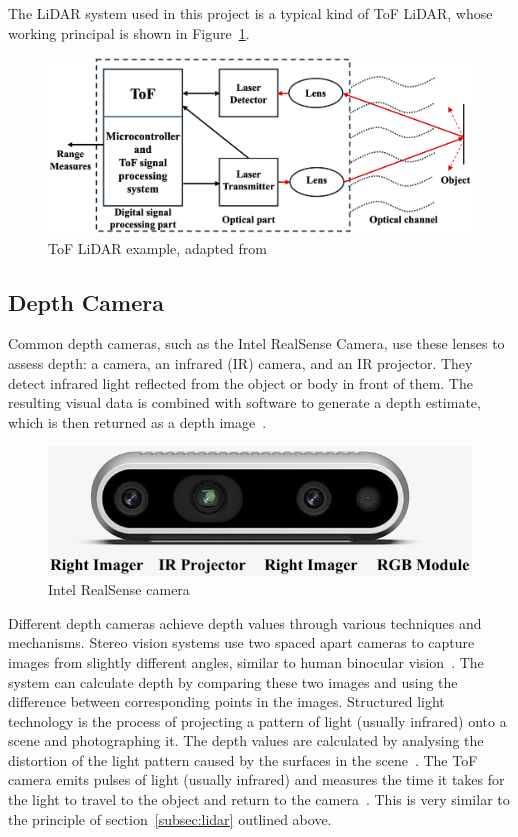 The LiDAR system used in this project is a typical kind of ToF LiDAR, whose working principal is shown in Figure~\ref{fig:lidar_example}.

\begin{figure}[H]
    \centering
    \includegraphics[width=1\linewidth]{figs/tof.png}
    \caption{ToF LiDAR example, adapted from~\cite{lidarexample}}
    \label{fig:lidar_example}
\end{figure}

\subsection{Depth Camera}
Common depth cameras, such as the Intel RealSense Camera, use these lenses to assess depth: 
a camera, an infrared (IR) camera, and an IR projector. 
They detect infrared light reflected from the object or body in front of them. 
The resulting visual data is combined with software to generate a depth estimate, 
which is then returned as a depth image~\cite{depthcam}.

\begin{figure}[H]
    \centering
    \includegraphics[width=1.0\linewidth]{figs/realsense.jpg}
    \caption{Intel RealSense camera}
\end{figure}

Different depth cameras achieve depth values through various techniques and mechanisms. 
Stereo vision systems use two spaced apart cameras to capture images from slightly different angles, 
similar to human binocular vision~\cite{kinect}. 
The system can calculate depth by comparing these two images and using the difference between corresponding points in the images. 
Structured light technology is the process of projecting a pattern of light (usually infrared) onto a scene and photographing it. 
The depth values are calculated by analysing the distortion of the light pattern caused by the surfaces in the scene~\cite{rgbdmapping}.
The ToF camera emits pulses of light (usually infrared) and measures the time it takes for the light to travel to the object and return to the camera~\cite{tof}. 
This is very similar to the principle of section~\ref{subsec:lidar} outlined above.

